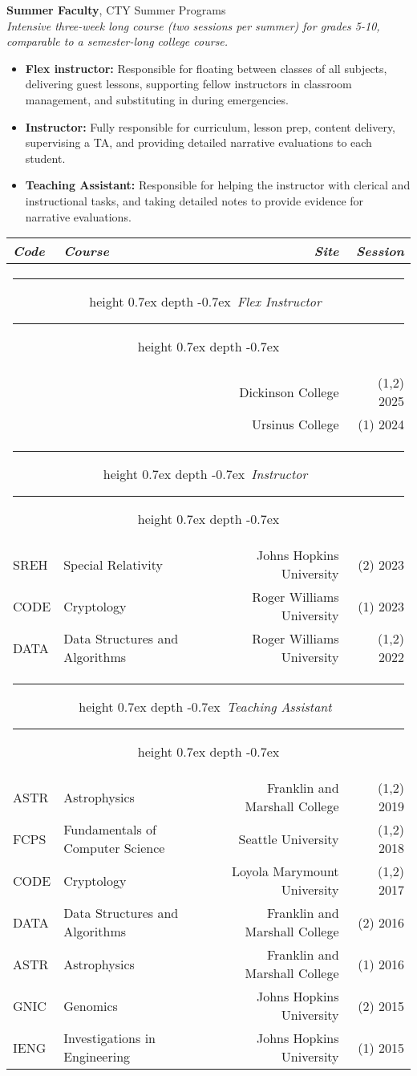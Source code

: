 \documentclass[marginmode, 10pt]{res} %
\def\Vhrulefill{\leavevmode\leaders\hrule height 0.7ex depth \dimexpr0.4pt-0.7ex\hfill\kern0pt}         %
\begin{document}
\begin{resume}
\textbf{Summer Faculty}, CTY Summer Programs \\
\textit{Intensive three-week long course (two sessions per summer) for grades 5-10, comparable to a semester-long college course.}
\begin{itemize}
    \item \textbf{Flex instructor:} Responsible for floating between classes of all subjects, delivering guest lessons, supporting fellow instructors in classroom management, and substituting in during emergencies.
    \item \textbf{Instructor:} Fully responsible for curriculum, lesson prep, content delivery, supervising a TA, and providing detailed narrative evaluations to each student.
    \item \textbf{Teaching Assistant:} Responsible for helping the instructor with clerical and instructional tasks, and taking detailed notes to provide evidence for narrative evaluations.
\end{itemize}
\begin{tabular*}{\textwidth}{ll@{\extracolsep{\fill}}rr}
    \textit{Code} & \textit{Course} & \textit{Site} & \textit{Session} \\
    \hline
    \multicolumn{4}{c}{\Vhrulefill ~\textit{Flex Instructor}~ \Vhrulefill} \\
    & & Dickinson College & (1,2) 2025 \\
    & & Ursinus College & (1) 2024 \\
    \multicolumn{4}{c}{\Vhrulefill ~\textit{Instructor}~ \Vhrulefill} \\
    SREH & Special Relativity & Johns Hopkins University & (2) 2023 \\
    CODE & Cryptology & Roger Williams University & (1) 2023 \\
    DATA & Data Structures and Algorithms & Roger Williams University & (1,2) 2022 \\
    \multicolumn{4}{c}{\Vhrulefill ~\textit{Teaching Assistant}~ \Vhrulefill} \\
    ASTR & Astrophysics & Franklin and Marshall College & (1,2) 2019 \\
    FCPS & Fundamentals of Computer Science & Seattle University & (1,2) 2018 \\
    CODE & Cryptology & Loyola Marymount University & (1,2) 2017 \\
    DATA & Data Structures and Algorithms & Franklin and Marshall College & (2) 2016 \\
    ASTR & Astrophysics & Franklin and Marshall College & (1) 2016 \\
    GNIC & Genomics & Johns Hopkins University & (2) 2015 \\
    IENG & Investigations in Engineering & Johns Hopkins University & (1) 2015
\end{tabular*}


\end{resume}
\end{document}
